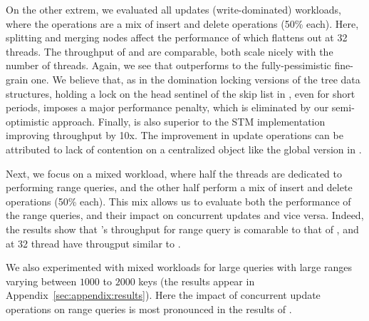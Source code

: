 On the other extrem, we evaluated all updates (write-dominated) workloads, where the operations are a mix of insert and delete operations (50\% each). Here, splitting and merging nodes affect the performance of \kary which flattens out at 32 threads. The throughput of \autoSkiplist and \stmSkiplist are comparable, both scale nicely with the number of threads.
Again, we see that \autoSkiplist outperforms
  to the fully-pessimistic fine-grain one. We believe that,
as in the
domination locking versions of the tree data structures, holding a lock on the head sentinel of the skip list in
\domSkiplist, even for short periods, imposes a major performance penalty,
which is eliminated by our semi-optimistic approach. 
Finally, \autoSkiplist is also superior to the STM implementation
improving throughput by
10x. The improvement in update operations can be attributed to lack of contention on a centralized object like the global version in \stmSkiplist.

Next, we focus on a mixed workload, where half the
threads are dedicated to performing range queries, and the other half perform a
mix of insert and delete operations (50\% each).
This mix allows us to evaluate both the performance of the range queries,
and their impact on concurrent updates and vice versa.
Indeed, the results show that \kary's throughput for range query is comarable to that of \skiplist, and at 32 thread have througput similar to \autoSkiplist.

We also experimented with mixed workloads for large queries with large ranges varying between $1000$ to $2000$ keys (the results appear in Appendix~\ref{sec:appendix:results}). Here the impact of concurrent update operations on range queries is most pronounced in the results of \kary.

